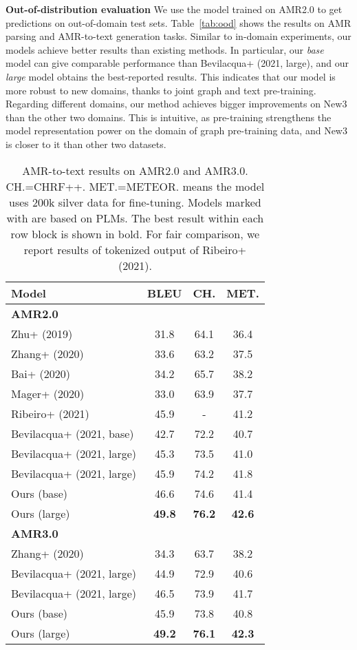 \documentclass[11pt]{article}
\begin{document}
\noindent\textbf{Out-of-distribution evaluation} 
We use the model trained on AMR2.0 to get predictions on out-of-domain test sets. 
Table~\ref{tab:ood} shows the results on AMR parsing and AMR-to-text generation tasks.
Similar to in-domain experiments, our models achieve better results than existing methods.
In particular, our \textit{base} model can give comparable performance than Bevilacqua+ (2021, large), and our \textit{large} model obtains the best-reported results. 
This indicates that our model is more robust to new domains, thanks to joint graph and text pre-training.
Regarding different domains, our method achieves bigger improvements on New3 than the other two domains.
This is intuitive, as pre-training strengthens the model representation power on the domain of graph pre-training data, and New3 is closer to it than other two datasets.
\begin{table}[!t]
	\centering
	\small
	\begin{tabular}{lccc}
		\toprule
		\textbf{Model} &\textbf{BLEU} &\textbf{CH.} &\textbf{MET.} \\
		\midrule
		\textbf{AMR2.0} &&&\\
		Zhu+ (2019) &31.8 &64.1 &36.4\\
		Zhang+ (2020) &33.6 &63.2 &37.5 \\
		Bai+ (2020) &34.2 &65.7 &38.2\\
		Mager+ (2020) &33.0 &63.9 &37.7\\
		Ribeiro+ (2021) &45.9 &- &{41.2}\\
		Bevilacqua+ (2021, base) &42.7 &72.2 &40.7\\
		Bevilacqua+ (2021, large) &45.3 &73.5 &41.0\\
		Bevilacqua+ (2021, large) &45.9 &74.2 &41.8\\
		\rowcolor{mygray}
		Ours (base) &46.6 &74.6 &41.4 \\
		\rowcolor{mygray}
		Ours (large) &\textbf{49.8} &\textbf{76.2} &\textbf{42.6} \\
\midrule
		\textbf{AMR3.0} &&&\\
		Zhang+ (2020) &34.3 &63.7 &38.2 \\
		Bevilacqua+ (2021, large) &44.9 &72.9 &40.6\\
		Bevilacqua+ (2021, large) &46.5 &73.9 &41.7\\
		\rowcolor{mygray}
		Ours (base) &45.9 &73.8 &40.8\\
		\rowcolor{mygray}
		Ours (large) &\textbf{49.2} &\textbf{76.1} &\textbf{42.3}\\
\bottomrule
	\end{tabular}
	\caption{AMR-to-text results on AMR2.0 and AMR3.0. CH.=CHRF++. MET.=METEOR.  means the model uses 200k silver data for fine-tuning. Models marked with  are based on PLMs. The best result within each row block is shown in bold. For fair comparison, we report results of tokenized output of Ribeiro+ (2021).}
	\label{tab:main-amr2text}
\end{table}
\end{document}
